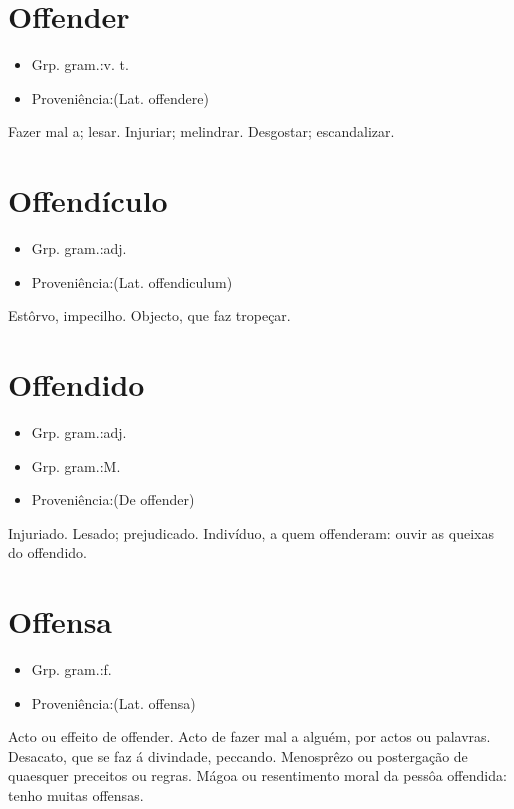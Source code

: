 \section{Offender}
\begin{itemize}
\item {Grp. gram.:v. t.}
\end{itemize}
\begin{itemize}
\item {Proveniência:(Lat. \textunderscore offendere\textunderscore )}
\end{itemize}
Fazer mal a; lesar.
Injuriar; melindrar.
Desgostar; escandalizar.
\section{Offendículo}
\begin{itemize}
\item {Grp. gram.:adj.}
\end{itemize}
\begin{itemize}
\item {Proveniência:(Lat. \textunderscore offendiculum\textunderscore )}
\end{itemize}
Estôrvo, impecilho.
Objecto, que faz tropeçar.
\section{Offendido}
\begin{itemize}
\item {Grp. gram.:adj.}
\end{itemize}
\begin{itemize}
\item {Grp. gram.:M.}
\end{itemize}
\begin{itemize}
\item {Proveniência:(De \textunderscore offender\textunderscore )}
\end{itemize}
Injuriado.
Lesado; prejudicado.
Indivíduo, a quem offenderam: \textunderscore ouvir as queixas do offendido\textunderscore .
\section{Offensa}
\begin{itemize}
\item {Grp. gram.:f.}
\end{itemize}
\begin{itemize}
\item {Proveniência:(Lat. \textunderscore offensa\textunderscore )}
\end{itemize}
Acto ou effeito de offender.
Acto de fazer mal a alguém, por actos ou palavras.
Desacato, que se faz á divindade, peccando.
Menosprêzo ou postergação de quaesquer preceitos ou regras.
Mágoa ou resentimento moral da pessôa offendida: \textunderscore tenho muitas offensas\textunderscore .
